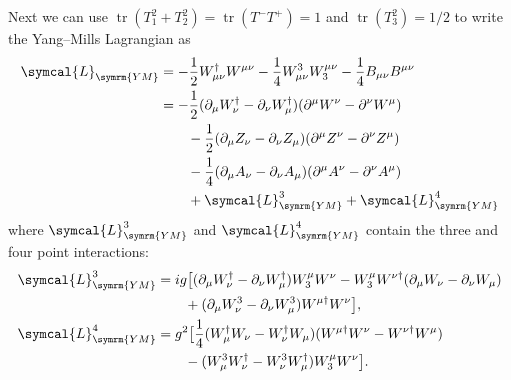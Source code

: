 \documentclass[fleqn]{NotesClass}
\newcommand{\hermit}{\dagger}
\newcommand{\lagrangianDensity}{\symcal{L}}
\DeclareMathOperator{\tr}{tr}
\newcommand{\yangmills}{\symrm{YM}}
\begin{document}
    Next we can use \(\tr(T_1^2 + T_2^2) = \tr(T^-T^+) = 1\) and \(\tr(T_3^2) = 1/2\) to write the Yang--Mills Lagrangian as
    \begin{align}
        \lagrangianDensity_{\yangmills} &= -\frac{1}{2}W_{\mu\nu}^\hermit W^{\mu\nu} - \frac{1}{4}W^3_{\mu\nu}W_3^{\mu\nu} - \frac{1}{4}B_{\mu\nu}B^{\mu\nu}\\
        &= -\frac{1}{2}(\partial_\mu W_\nu^\hermit - \partial_\nu W_\mu^\hermit)(\partial^\mu W^\nu - \partial^\nu W^\mu)\\
        &\qquad - \frac{1}{2}(\partial_\mu Z_\nu - \partial_\nu Z_\mu)(\partial^\mu Z^\nu - \partial^\nu Z^\mu)\\
        &\qquad - \frac{1}{4}(\partial_\mu A_\nu - \partial_\nu A_\mu)(\partial^\mu A^\nu - \partial^\nu A^\mu)\\
        &\qquad + \lagrangianDensity^3_{\yangmills} + \lagrangianDensity^4_{\yangmills}
    \end{align}
    where \(\lagrangianDensity^3_{\yangmills}\) and \(\lagrangianDensity^4_{\yangmills}\) contain the three and four point interactions:
    \begin{align}
        \lagrangianDensity^3_{\yangmills} &= ig\big[ (\partial_\mu W_\nu^\hermit - \partial_\nu W_\mu^\hermit)W_3^\mu W^\nu - W_3^\mu W^{\nu\hermit}(\partial_\mu W_\nu - \partial_\nu W_\mu) \notag\\
        &\qquad + (\partial_\mu W^3_\nu - \partial_\nu W^3_\mu) W^{\mu\hermit}W^\nu \big],\\
        \lagrangianDensity^4_{\yangmills} &= g^2\big[ \frac{1}{4}(W_\mu^\hermit W_\nu - W_\nu^\hermit W_\mu)(W^{\mu\hermit} W^\nu - W^{\nu\hermit}W^\mu) \notag\\
        &\qquad - (W^3_\mu W_\nu^\hermit - W^3_\nu W_\mu^\hermit) W_3^\mu W^\nu \big].
    \end{align}
    
\end{document}
